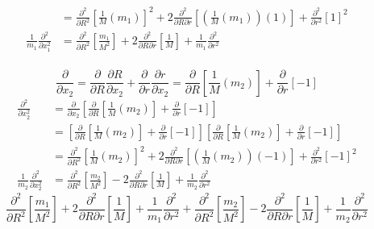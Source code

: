 \documentclass{article}
\begin{document}
{\begin{enumerate}
\begin{equation*}
\begin{split}
				&= \frac{\partial^2}{\partial R^2} \left[ \frac{1}{M} \left( m_1 \right) \right]^2 + 2 \frac{\partial^2}{\partial R \partial r} \left[\left( \frac{1}{M} \left( m_1 \right) \right) \left( 1 \right)\right] + \frac{\partial^2}{\partial r^2} \left[ 1 \right]^2 \\
				\frac{1}{m_1} \frac{\partial^2}{\partial x^2_1} &= \frac{\partial^2}{\partial R^2} \left[ \frac{m_1}{M^2} \right] + 2 \frac{\partial^2}{\partial R \partial r} \left[ \frac{1}{M}\right] + \frac{1}{m_1} \frac{\partial^2}{\partial r^2}
			\end{split}
		\end{equation*}
		\\
		\[
			\frac{\partial}{\partial x_2} = \frac{\partial}{\partial R} \frac{\partial R}{\partial x_2} + \frac{\partial}{\partial r} \frac{\partial r}{\partial x_2} = \frac{\partial}{\partial R} \left[ \frac{1}{M} \left( m_2 \right) \right] + \frac{\partial}{\partial r} \left[ -1 \right]
		\]
		\begin{equation*}
			\begin{split}
				\frac{\partial^2}{\partial x^2_2} &= \frac{\partial}{\partial x_2} \left[ \frac{\partial}{\partial R} \left[ \frac{1}{M} \left( m_2 \right) \right] + \frac{\partial}{\partial r} \left[ -1 \right] \right] \\
				&= \left[ \frac{\partial}{\partial R} \left[ \frac{1}{M} \left( m_2 \right) \right] + \frac{\partial}{\partial r} \left[ -1 \right] \right] \left[ \frac{\partial}{\partial R} \left[ \frac{1}{M} \left( m_2 \right) \right] + \frac{\partial}{\partial r} \left[ -1 \right] \right] \\
				&= \frac{\partial^2}{\partial R^2} \left[ \frac{1}{M} \left( m_2 \right) \right]^2 + 2 \frac{\partial^2}{\partial R \partial r} \left[\left( \frac{1}{M} \left( m_2 \right) \right) \left( -1 \right)\right] + \frac{\partial^2}{\partial r^2} \left[ -1 \right]^2 \\
				\frac{1}{m_2} \frac{\partial^2}{\partial x^2_2} &= \frac{\partial^2}{\partial R^2} \left[ \frac{m_2}{M^2} \right] - 2 \frac{\partial^2}{\partial R \partial r} \left[ \frac{1}{M} \right] + \frac{1}{m_2} \frac{\partial^2}{\partial r^2}
			\end{split}
		\end{equation*}
		\[
			 \frac{\partial^2}{\partial R^2} \left[ \frac{m_1}{M^2} \right] + 2 \frac{\partial^2}{\partial R \partial r} \left[ \frac{1}{M}\right] + \frac{1}{m_1} \frac{\partial^2}{\partial r^2} + \frac{\partial^2}{\partial R^2} \left[ \frac{m_2}{M^2} \right] - 2 \frac{\partial^2}{\partial R \partial r} \left[ \frac{1}{M} \right] + \frac{1}{m_2} \frac{\partial^2}{\partial r^2}
\]
\end{enumerate}}
\end{document}
